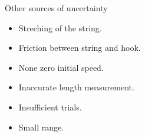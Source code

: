\documentclass[a4paper]{article}
\begin{document}
\begin{tcolorbox}[title = Note]
    Other sources of uncertainty
    \begin{itemize}
        \item Streching of the string.
        \item Friction between string and hook.
        \item None zero initial speed.
        \item Inaccurate length measurement.
        \item Insufficient trials.
        \item Small range. 
    \end{itemize}
\end{tcolorbox}

\clearpage


\end{document}
